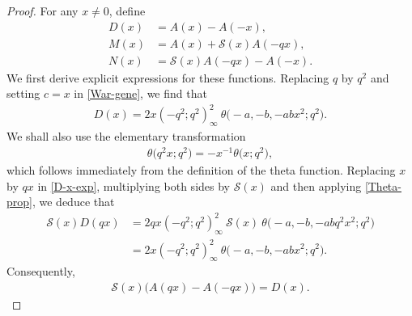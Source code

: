 \documentclass[10pt,a4paper]{amsart}
\begin{document}
\begin{proof}
For any $x\neq0$, define
\begin{align}
D(x) &=A(x)-A(-x),\label{Def-D-x}\\
M(x) &=A(x)+\mathscr{S}(x)A(-qx),\label{Def-M-x}\\
N(x) &=\mathscr{S}(x)A(-qx)-A(-x).\label{Def-N-x}
\end{align}
We first derive explicit expressions for these functions. Replacing $q$ by $q^2$ and
setting $c=x$ in \eqref{War-gene}, we find that
\begin{align}
D(x)=2x(-q^2;q^2)_\infty^2\!\:\theta\big({-}a,-b,-abx^2;q^2\big).\label{D-x-exp}
\end{align}
We shall also use the elementary transformation
\begin{align}
\theta\big(q^2x;q^2\big)=-x^{-1}\theta\big(x;q^2\big),\label{Theta-prop}
\end{align}
which follows immediately from the definition of the theta function. Replacing $x$ by
$qx$ in \eqref{D-x-exp}, multiplying both sides by $\mathscr{S}(x)$ and then applying
\eqref{Theta-prop}, we deduce that
\begin{align*}
\mathscr{S}(x)D(qx) &=2qx(-q^2;q^2)_\infty^2\!\:\mathscr{S}(x)\!\:\theta
\big({-}a,-b,-abq^2x^2;q^2\big)
\nonumber\\
 &=2x(-q^2;q^2)_\infty^2\!\:\theta\big({-}a,-b,-abx^2;q^2\big).
\end{align*}
Consequently,
\begin{align}
\mathscr{S}(x)\big(A(qx)-A(-qx)\big)=D(x).\label{Aux-iden-1}
\end{align}


\end{proof}
\end{document}
